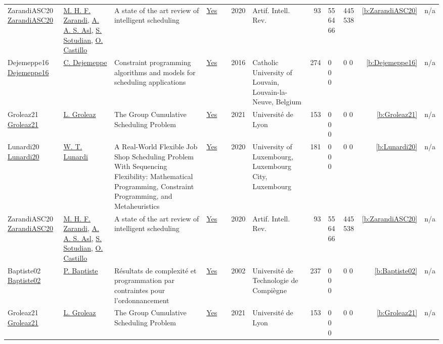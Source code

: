 {\begin{longtable}{>{\raggedright\arraybackslash}p{3cm}>{\raggedright\arraybackslash}p{4.5cm}>{\raggedright\arraybackslash}p{6.0cm}rrrp{2.5cm}rp{1cm}p{1cm}rr}
ZarandiASC20 \href{https://doi.org/10.1007/s10462-018-9667-6}{ZarandiASC20} & \hyperref[auth:a829]{M. H. F. Zarandi}, \hyperref[auth:a830]{A. A. S. Asl}, \hyperref[auth:a831]{S. Sotudian}, \hyperref[auth:a832]{O. Castillo} & A state of the art review of intelligent scheduling & \href{../works/ZarandiASC20.pdf}{Yes} & \cite{ZarandiASC20} & 2020 & Artif. Intell. Rev. & 93 & 55 64 66 & 445 538 & \ref{b:ZarandiASC20} & n/a\\
Dejemeppe16 \href{https://hdl.handle.net/2078.1/178078}{Dejemeppe16} & \hyperref[auth:a202]{C. Dejemeppe} & Constraint programming algorithms and models for scheduling applications & \href{../works/Dejemeppe16.pdf}{Yes} & \cite{Dejemeppe16} & 2016 & Catholic University of Louvain, Louvain-la-Neuve, Belgium & 274 & 0 0 0 & 0 0 & \ref{b:Dejemeppe16} & n/a\\
Groleaz21 \href{https://hal.science/tel-03266690}{Groleaz21} & \hyperref[auth:a83]{L. Groleaz} & {The Group Cumulative Scheduling Problem} & \href{../works/Groleaz21.pdf}{Yes} & \cite{Groleaz21} & 2021 & {Universit{\'e} de Lyon} & 153 & 0 0 0 & 0 0 & \ref{b:Groleaz21} & n/a\\
Lunardi20 \href{http://orbilu.uni.lu/handle/10993/43893}{Lunardi20} & \hyperref[auth:a496]{W. T. Lunardi} & A Real-World Flexible Job Shop Scheduling Problem With Sequencing Flexibility: Mathematical Programming, Constraint Programming, and Metaheuristics & \href{../works/Lunardi20.pdf}{Yes} & \cite{Lunardi20} & 2020 & University of Luxembourg, Luxembourg City, Luxembourg & 181 & 0 0 0 & 0 0 & \ref{b:Lunardi20} & n/a\\
ZarandiASC20 \href{https://doi.org/10.1007/s10462-018-9667-6}{ZarandiASC20} & \hyperref[auth:a829]{M. H. F. Zarandi}, \hyperref[auth:a830]{A. A. S. Asl}, \hyperref[auth:a831]{S. Sotudian}, \hyperref[auth:a832]{O. Castillo} & A state of the art review of intelligent scheduling & \href{../works/ZarandiASC20.pdf}{Yes} & \cite{ZarandiASC20} & 2020 & Artif. Intell. Rev. & 93 & 55 64 66 & 445 538 & \ref{b:ZarandiASC20} & n/a\\
Baptiste02 \href{https://theses.hal.science/tel-00124998}{Baptiste02} & \hyperref[auth:a162]{P. Baptiste} & {R{\'e}sultats de complexit{\'e} et programmation par contraintes pour l'ordonnancement} & \href{../works/Baptiste02.pdf}{Yes} & \cite{Baptiste02} & 2002 & {Universit{\'e} de Technologie de Compi{\`e}gne} & 237 & 0 0 0 & 0 0 & \ref{b:Baptiste02} & n/a\\
Groleaz21 \href{https://hal.science/tel-03266690}{Groleaz21} & \hyperref[auth:a83]{L. Groleaz} & {The Group Cumulative Scheduling Problem} & \href{../works/Groleaz21.pdf}{Yes} & \cite{Groleaz21} & 2021 & {Universit{\'e} de Lyon} & 153 & 0 0 0 & 0 0 & \ref{b:Groleaz21} & n/a\\

\end{longtable}}
